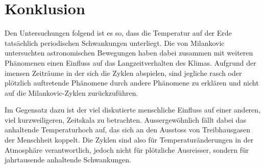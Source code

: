 %
%
%
%
\section{Konklusion
\label{milankovic:section:Konklusion}}

Den Untersuchungen folgend ist es so, dass die Temperatur auf der Erde tatsächlich periodischen Schwankungen unterliegt.
Die von Milankovic untersuchten astronomischen Bewegungen haben dabei zusammen mit weiteren Phänomenen einen Einfluss auf das Langzeitverhalten des Klimas.
Aufgrund der imensen Zeiträume in der sich die Zyklen abspielen, sind jegliche rasch oder plötzlich auftretende Phänomene durch andere Phänomene zu erklären und nicht auf die Milankovic-Zyklen zurückzuführen. 

Im Gegensatz dazu ist der viel diskutierte menschliche Einfluss auf einer anderen, viel kurzweiligeren, Zeitskala zu betrachten.
Aussergewöhnlich fällt dabei das anhaltende Temperaturhoch auf, das sich an den Ausstoss von Treibhausgasen der Menschheit koppelt.
Die Zyklen sind also für Temperaturänderungen in der Atmosphäre verantwortlich, jedoch nicht für plötzliche Ausreisser, sondern für jahrtausende anhaltende Schwankungen.

